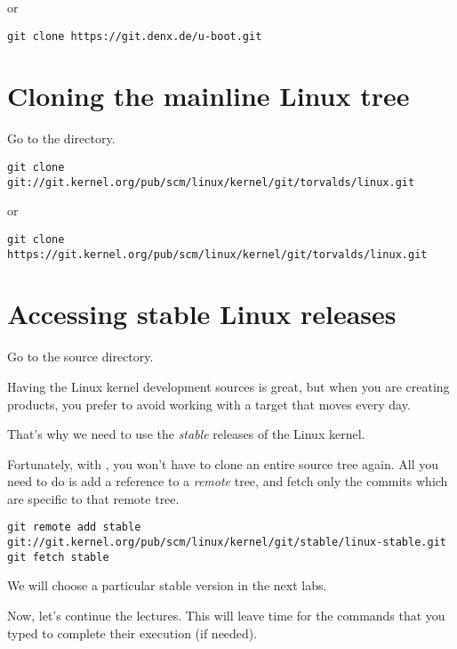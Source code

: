 or

\begin{verbatim}
git clone https://git.denx.de/u-boot.git
\end{verbatim}

\section{Cloning the mainline Linux tree}

Go to the  directory.

\begin{verbatim}
git clone git://git.kernel.org/pub/scm/linux/kernel/git/torvalds/linux.git
\end{verbatim}

or

\begin{verbatim}
git clone https://git.kernel.org/pub/scm/linux/kernel/git/torvalds/linux.git
\end{verbatim}

\section{Accessing stable Linux releases}

Go to the  source directory.

Having the Linux kernel development sources is great, but when you are
creating products, you prefer to avoid working with a target that moves
every day.

That's why we need to use the {\em stable} releases of the Linux
kernel.

Fortunately, with , you won't have to clone an entire source
tree again. All you need to do is add a reference to a {\em remote}
tree, and fetch only the commits which are specific to that remote tree.

{\small
\begin{verbatim}
git remote add stable git://git.kernel.org/pub/scm/linux/kernel/git/stable/linux-stable.git
git fetch stable
\end{verbatim}
}

We will choose a particular stable version in the next labs.

Now, let's continue the lectures. This will leave time for the commands
that you typed to complete their execution (if needed).
